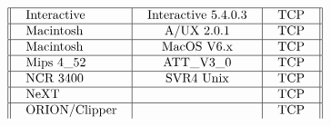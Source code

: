 \[\begin{tabular}[h]{||l|c|c||}
\hline
\begin{tabular}{l} Interactive \end{tabular} & \begin{tabular}{l} Interactive 5.4.0.3 \end{tabular} & \begin{tabular}{l} TCP \end{tabular} \\
\hline
\begin{tabular}{l} Macintosh \end{tabular} & \begin{tabular}{l} A/UX 2.0.1 \end{tabular} & \begin{tabular}{l} TCP \end{tabular} \\
\hline
\begin{tabular}{l} Macintosh \end{tabular} & \begin{tabular}{l} MacOS V6.x \end{tabular} & \begin{tabular}{l} TCP \end{tabular} \\
\hline
\begin{tabular}{l} Mips 4\_52 \end{tabular} & \begin{tabular}{l} 	ATT\_V3\_0 \end{tabular} & \begin{tabular}{l} TCP \end{tabular} \\
\hline
\begin{tabular}{l} NCR 3400 \end{tabular} & \begin{tabular}{l}  SVR4 Unix \end{tabular} & \begin{tabular}{l} TCP \end{tabular} \\
\hline
\begin{tabular}{l} NeXT \end{tabular} & \begin{tabular}{l} 	 \end{tabular} & \begin{tabular}{l} TCP \end{tabular} \\
\hline
\begin{tabular}{l} ORION/Clipper \end{tabular} & \begin{tabular}{l}  \end{tabular} & \begin{tabular}{l} TCP \end{tabular} \\

\end{tabular}\]
